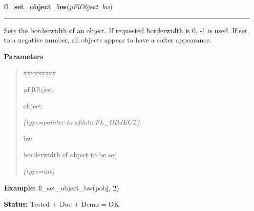 \hspace{.8\funcindent}\begin{boxedminipage}{\funcwidth}

    \raggedright \textbf{fl\_set\_object\_bw}(\textit{pFlObject}, \textit{bw})

    \vspace{-1.5ex}

    \rule{\textwidth}{0.5\fboxrule}
\setlength{\parskip}{2ex}
    Sets the borderwidth of an object. If requested borderwidth is 0, -1 is
    used. If set to a negative number, all objects appear to have a softer 
    appearance.

\setlength{\parskip}{1ex}
      \textbf{Parameters}
      \vspace{-1ex}

      \begin{quote}
        \begin{Ventry}{xxxxxxxxx}

          \item[pFlObject]

          object

            {\it (type=pointer to xfdata.FL\_OBJECT)}

          \item[bw]

          borderwidth of object to be set

            {\it (type=int)}

        \end{Ventry}

      \end{quote}

\textbf{Example:} fl\_set\_object\_bw(pobj, 2)



\textbf{Status:} Tested + Doc + Demo = OK



    \end{boxedminipage}

    \label{xformslib:flbasic:fl_get_object_bw}

    \vspace{0.5ex}

